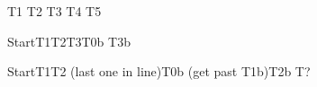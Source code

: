 \documentclass{article}
\begin{document}
\kant[1][1] \tabto{3cm}T1 \tabto{4cm}T2
\tabto{3cm}T3 \kant[1][2] \tabto{4cm}T4
\tabto*{2cm}T5

Start\tab T1\tab T2\tab T3\tab T0b \tab\tab T3b

Start\tab T1\tab T2 (last one in line)\tab T0b
(get past T1b)\tab T2b T?
\end{document}
